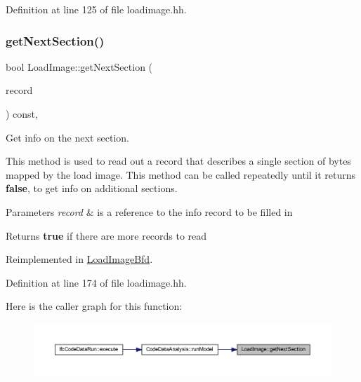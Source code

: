 Definition at line 125 of file loadimage.\+hh.

\mbox{\label{class_load_image_ab4a927238becd33d8eb75ddc96cc9616}} 
\subsubsection{\texorpdfstring{getNextSection()}{getNextSection()}}
{\footnotesize\ttfamily bool Load\+Image\+::get\+Next\+Section (\begin{DoxyParamCaption}\item[{\mbox{\hyperlink{struct_load_image_section}{Load\+Image\+Section}} \&}]{record }\end{DoxyParamCaption}) const\hspace{0.3cm}{\ttfamily [inline]}, {\ttfamily [virtual]}}



Get info on the next section. 

This method is used to read out a record that describes a single section of bytes mapped by the load image. This method can be called repeatedly until it returns {\bfseries{false}}, to get info on additional sections. 
\begin{DoxyParams}{Parameters}
{\em record} & is a reference to the info record to be filled in \\
\hline
\end{DoxyParams}
\begin{DoxyReturn}{Returns}
{\bfseries{true}} if there are more records to read 
\end{DoxyReturn}


Reimplemented in \mbox{\hyperlink{class_load_image_bfd_aaae78fac403213f2dc9ebf97ac28a5b2}{Load\+Image\+Bfd}}.



Definition at line 174 of file loadimage.\+hh.

Here is the caller graph for this function\+:
\nopagebreak
\begin{figure}[H]
\begin{center}
\leavevmode
\includegraphics[width=350pt]{class_load_image_ab4a927238becd33d8eb75ddc96cc9616_icgraph}
\end{center}
\end{figure}
\mbox{\label{class_load_image_af4a887cf44c719c576bb05605a4c5c7e}} 
